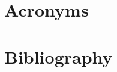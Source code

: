 \documentclass[a4paper]{article}
\begin{document}
\section*{Acronyms}
\begin{acronym}

\end{acronym}

\section*{Bibliography}
\newpage



\end{document}
